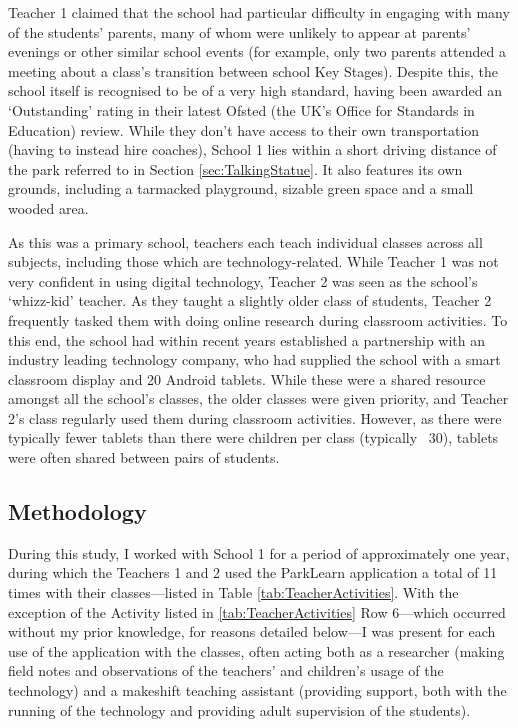 Teacher 1 claimed that the school had particular difficulty in engaging with many of the students' parents, many of whom were unlikely to appear at parents' evenings or other similar school events (for example, only two parents attended a meeting about a class's transition between school Key Stages). Despite this, the school itself is recognised to be of a very high standard, having been awarded an `Outstanding' rating in their latest Ofsted (the UK’s Office for Standards in Education) review. While they don't have access to their own transportation (having to instead hire coaches), School 1 lies within a short driving distance of the park referred to in Section \ref{sec:TalkingStatue}. It also features its own grounds, including a tarmacked playground, sizable green space and a small wooded area.

As this was a primary school, teachers each teach individual classes across all subjects, including those which are technology-related. While Teacher 1 was not very confident in using digital technology, Teacher 2 was seen as the school's `whizz-kid' teacher. As they taught a slightly older class of students, Teacher 2 frequently tasked them with doing online research during classroom activities. To this end, the school had within recent years established a partnership with an industry leading technology company, who had supplied the school with a smart classroom display and 20 Android tablets. While these were a shared resource amongst all the school’s classes, the older classes were given priority, and Teacher 2's class regularly used them during classroom activities. However, as there were typically fewer tablets than there were children per class (typically ~30), tablets were often shared between pairs of students.

\subsection{Methodology}

During this study, I worked with School 1 for a period of approximately one year, during which the Teachers 1 and 2 used the ParkLearn application a total of 11 times with their classes---listed in Table \ref{tab:TeacherActivities}. With the exception of the Activity listed in \ref{tab:TeacherActivities} Row 6---which occurred without my prior knowledge, for reasons detailed below---I was present for each use of the application with the classes, often acting both as a researcher (making field notes and observations of the teachers' and children's usage of the technology) and a makeshift teaching assistant (providing support, both with the running of the technology and providing adult supervision of the students).

